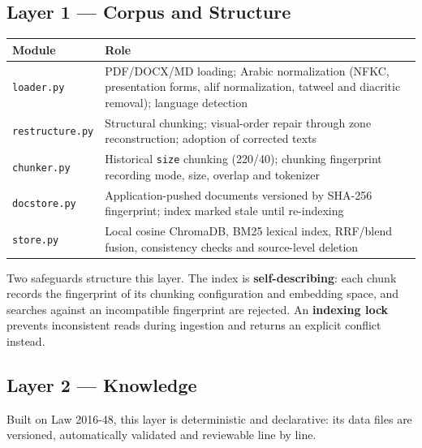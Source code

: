 \documentclass[a4paper,12pt,openany]{report}
\begin{document}
\subsection{Layer 1 — Corpus and Structure}
\begin{table}[htbp]
\centering
\small
\begin{tabular}{p{3.0cm}p{11.5cm}}
\toprule
\textbf{Module} & \textbf{Role} \\
\midrule
\texttt{loader.py} & PDF/DOCX/MD loading; Arabic normalization (NFKC, presentation forms,
alif normalization, tatweel and diacritic removal); language detection \\
\texttt{restructure.py} & Structural chunking; visual-order repair through zone reconstruction;
adoption of corrected texts \\
\texttt{chunker.py} & Historical \texttt{size} chunking (220/40); chunking fingerprint recording
mode, size, overlap and tokenizer \\
\texttt{docstore.py} & Application-pushed documents versioned by SHA-256 fingerprint; index marked
stale until re-indexing \\
\texttt{store.py} & Local cosine ChromaDB, BM25 lexical index, RRF/blend fusion, consistency checks
and source-level deletion \\
\bottomrule
\end{tabular}
\end{table}

Two safeguards structure this layer. The index is \textbf{self-describing}: each chunk records the
fingerprint of its chunking configuration and embedding space, and searches against an
incompatible fingerprint are rejected. An \textbf{indexing lock} prevents inconsistent reads
during ingestion and returns an explicit conflict instead.

\subsection{Layer 2 — Knowledge}
Built on Law 2016-48, this layer is deterministic and declarative: its data files are versioned,
automatically validated and reviewable line by line.
\end{document}
